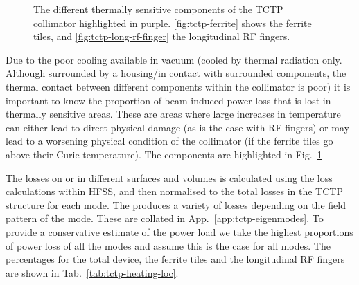 \begin{figure}
\caption{The different thermally sensitive components of the TCTP collimator highlighted in purple. \ref{fig:tctp-ferrite} shows the ferrite tiles, and \ref{fig:tctp-long-rf-finger} the longitudinal RF fingers.}
\label{fig:tctp-heat-loc}
\end{figure}

Due to the poor cooling available in vacuum (cooled by thermal radiation only. Although surrounded by a housing/in contact with surrounded components, the thermal contact between different components within the collimator is poor) it is important to know the proportion of beam-induced power loss that is lost in thermally sensitive areas. These are areas where large increases in temperature can either lead to direct physical damage (as is the case with RF fingers) or may lead to a worsening physical condition of the collimator (if the ferrite tiles go above their Curie temperature). The components are highlighted in Fig.~\ref{fig:tctp-heat-loc}

The losses on or in different surfaces and volumes is calculated using the loss calculations within HFSS, and then normalised to the total losses in the TCTP structure for each mode. The produces a variety of losses depending on the field pattern of the mode. These are collated in App.~\ref{app:tctp-eigenmodes}. To provide a conservative estimate of the power load we take the highest proportions of power loss of all the modes and assume this is the case for all modes. The percentages for the total device, the ferrite tiles and the longitudinal RF fingers are shown in Tab.~\ref{tab:tctp-heating-loc}. 

